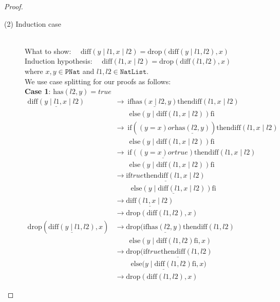 \documentclass[12pt, a4paper]{article}
\newcommand{\rel}[1]{\mathrel{#1}}
\newcommand{\rmx}[1]{\mathrm{#1}}
\newcommand{\larrow}{\longrightarrow}
\newcommand{\under}{\underline}
\begin{document}
\begin{proof}
\begin{description}
\item[(2) Induction case]~\\
What to show: $\quad \rmx{diff}(y \mid l1, x \mid l2) = \rmx{drop}(\rmx{diff}(y \mid l1, l2), x)$ \\
Induction hypothesis: $\quad \rmx{diff}(l1, x \mid l2) = \rmx{drop}(\rmx{diff}(l1, l2), x)$  \\
where $x,y \in \mathtt{PNat}$ and $l1, l2 \in \mathtt{NatList}$.\\
We use case splitting for our proofs as follows: \\
\textbf{Case 1}: $\rmx{has}(l2, y) = true$
\begin{align*}
\under{\rmx{diff}(y \mid l1, x \mid l2)}
	&\larrow\ \rel{\rmx{if}} \under{\rmx{has}(x \mid l2, y)} \rel{\rmx{then}} \rmx{diff}(l1, x \mid l2) \\
	&\quad \quad \rel{\rmx{else}} (y \mid \rmx{diff}(l1, x \mid l2)) \rel{\rmx{fi}} \tag{by diff2} \\
	&\larrow\ \rel{\rmx{if}} ((y = x) \rel{or} \under{\rmx{has}(l2, y)}) \rel{\rmx{then}} \rmx{diff}(l1, x \mid l2) \\
	&\quad \quad \rel{\rmx{else}} (y \mid \rmx{diff}(l1, x \mid l2)) \rel{\rmx{fi}} \tag{by has2} \\
	&\larrow\ \rel{\rmx{if}} \under{((y = x) \rel{or} true)} \rel{\rmx{then}} \rmx{diff}(l1, x \mid l2) \\
	&\quad \quad \rel{\rmx{else}} (y \mid \rmx{diff}(l1, x \mid l2)) \rel{\rmx{fi}} \tag{by case splitting} \\
	&\larrow \under{\rel{\rmx{if}} true \rel{\rmx{then}} \rmx{diff}(l1, x \mid l2)} \\
	&\quad \quad\ \under{\rel{\rmx{else}} (y \mid \rmx{diff}(l1, x \mid l2)) \rel{\rmx{fi}}} \tag{by or} \\
	&\larrow \under{\rmx{diff}(l1, x \mid l2)} \tag{by if1} \\
	&\larrow \rmx{drop}(\rmx{diff}(l1, l2), x) \tag{by IH} \\
\rmx{drop}(\under{\rmx{diff}(y \mid l1, l2)}, x)
	&\larrow \rmx{drop}(\rel{\rmx{if}} \under{\rmx{has}(l2, y)} \rel{\rmx{then}} \rmx{diff}(l1, l2) \\
	&\quad \quad \rel{\rmx{else}} (y \mid \rmx{diff}(l1, l2) \rel{\rmx{fi}}, x) \tag{by diff2} \\
	&\larrow \rmx{drop}(\under{\rel{\rmx{if}} true \rel{\rmx{then}} \rmx{diff}(l1, l2)} \\
	&\quad \quad\ \under{\rel{\rmx{else}} (y \mid \rmx{diff}(l1, l2) \rel{\rmx{fi}}}, x) \tag{by case splitting} \\
	&\larrow \rmx{drop}(\rmx{diff}(l1, l2), x) \tag{by if1}
\end{align*}


\end{description}
\end{proof}
\end{document}
